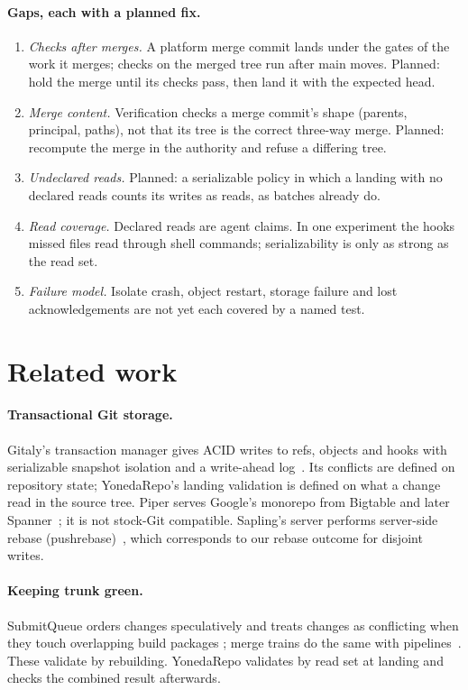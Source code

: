 \documentclass[11pt]{article}
\begin{document}
\paragraph{Gaps, each with a planned fix.}
\begin{enumerate}
\item \emph{Checks after merges.} A platform merge commit lands under the gates of the
  work it merges; checks on the merged tree run after main moves. Planned: hold the merge
  until its checks pass, then land it with the expected head.
\item \emph{Merge content.} Verification checks a merge commit's shape (parents,
  principal, paths), not that its tree is the correct three-way merge. Planned: recompute
  the merge in the authority and refuse a differing tree.
\item \emph{Undeclared reads.} Planned: a serializable policy in which a landing with no
  declared reads counts its writes as reads, as batches already do.
\item \emph{Read coverage.} Declared reads are agent claims. In one experiment the hooks
  missed files read through shell commands; serializability is only as strong as the
  read set.
\item \emph{Failure model.} Isolate crash, object restart, storage failure and lost
  acknowledgements are not yet each covered by a named test.
\end{enumerate}

\section{Related work}
\label{sec:related}

\paragraph{Transactional Git storage.} Gitaly's transaction manager gives ACID writes
to refs, objects and hooks with serializable snapshot isolation and a write-ahead
log~\cite{gitaly2024tx}. Its conflicts are defined on repository state; YonedaRepo's
landing validation is defined on what a change read in the source tree. Piper serves
Google's monorepo from Bigtable and later Spanner~\cite{potvin2016piper}; it is not
stock-Git compatible. Sapling's server performs server-side rebase
(pushrebase)~\cite{sapling}, which corresponds to our rebase outcome for disjoint
writes.

\paragraph{Keeping trunk green.} SubmitQueue orders changes speculatively and treats
changes as conflicting when they touch overlapping build packages
\cite{ananthanarayanan2019submitqueue,juloori2025ci}; merge trains do the same with
pipelines~\cite{gitlabmergetrains}. These validate by rebuilding. YonedaRepo validates
by read set at landing and checks the combined result afterwards.
\end{document}
